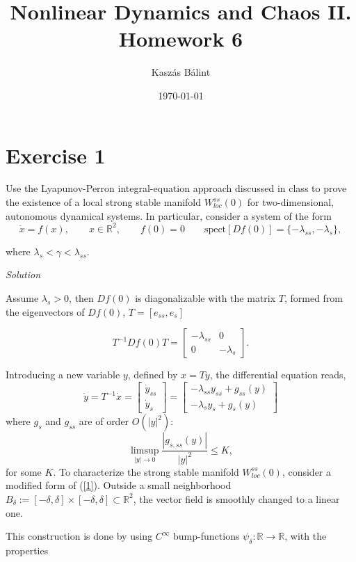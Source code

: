 \documentclass[a4paper,11pt,pdftex]{article}
\title{Nonlinear Dynamics and Chaos II. \\ Homework 6}
\author{Kaszás Bálint}
\date{\today}
\newcommand{\R}{\mathbb{R}}
\newcommand{\W}{W^{ss}_{loc}(0)}
\begin{document}
\pagestyle{fancy}

\maketitle


\section*{Exercise 1}
Use the Lyapunov-Perron integral-equation approach discussed in class to prove the existence of a local
strong stable manifold $\W$ for two-dimensional, autonomous dynamical systems. In particular, consider a system of the form
$$
\dot{x} = f(x), \qquad x\in \mathbb{R}^2, \qquad f(0)= 0 \qquad \text{spect}[Df(0)] = \{ -\lambda_{ss}, -\lambda_s\},
$$

where $\lambda_s < \gamma < \lambda_{ss}$.

\emph{Solution}

Assume $\lambda_s > 0$, then $Df(0)$ is diagonalizable with the matrix $T$, formed from the eigenvectors of $Df(0)$, $T= [e_{ss}, e_{s}]$

$$
T^{-1}Df(0)T = \begin{bmatrix}
-\lambda_{ss} & 0 \\
0 & -\lambda_{s}
 \end{bmatrix}.
$$

Introducing a new variable $y$, defined by $x = Ty$, the differential equation reads,
\begin{equation}
\label{1}
\dot{y} = T^{-1}\dot{x} = \begin{bmatrix}
\dot{y}_{ss} \\ 
\dot{y}_{s}\end{bmatrix} = \begin{bmatrix}
-\lambda_{ss} y_{ss} + g_{ss}(y) \\
-\lambda_{s} y_{s} + g_{s}(y)
\end{bmatrix}    
\end{equation}
where $g_s$ and $g_{ss}$ are of order $O(|y|^2)$:
\begin{equation}
    \limsup_{|y|\to 0} \frac{|g_{s,ss}(y)|}{|y|^2}\leq K,
\end{equation}
for some $K$. 
To characterize the strong stable manifold $\W$, consider a modified form of (\ref{1}). Outside a small neighborhood $B_\delta:=[-\delta, \delta] \times [-\delta, \delta]\subset \R^2$, the vector field is smoothly changed to a linear one. 

This construction is done by using $C^\infty$ bump-functions $\psi_\delta : \R \to \R$, with the properties 
\end{document}
